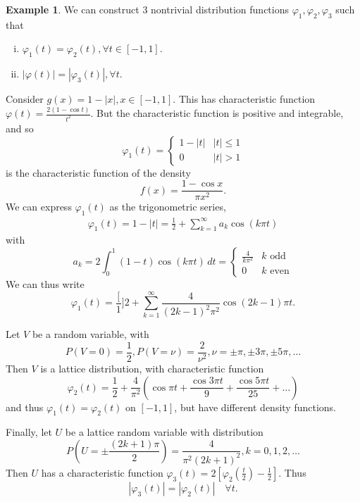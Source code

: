 \documentclass[10pt, oneside, reqno]{amsart}
\theoremstyle{plain}%
\theoremstyle{definition}
\newtheorem{exmp}[thm]{Example}
\theoremstyle{remark}
\renewcommand{\phi}{\varphi}
\begin{document}
\begin{exmp}
    We can construct 3 nontrivial distribution functions $\phi_1, \phi_2, \phi_3$ such that 
\begin{enumerate}[(i)]
    \item $\phi_1(t) = \phi_2(t), \forall t \in [-1,1]$.  
    \item $|\phi(t)| = | \phi_3(t) |, \forall t$.  
\end{enumerate}

Consider $g(x) = 1 - | x |, x \in [ -1, 1]$.  This has characteristic function $\phi(t) = \frac{2(1 - \cos t)}{t^2}$.  But the characteristic function is positive and integrable, and so\[
    \phi_1(t) = \begin{cases}
        1 - |t| & |t| \leq 1 \\
        0       & |t| > 1
    \end{cases}
\] is the characteristic function of the density \[
    f(x) = \frac{1 - \cos x}{\pi x^2}.
\]  We can express $\phi_1(t)$ as the trigonometric series, \begin{align*}
    \phi_1(t) = 1 - |t| = \frac{1}{2} + \sum_{k=1}^\infty a_k \cos( k \pi t) 
\end{align*} with \[
    a_k = 2 \int_0^1 ( 1 - t) \cos(k \pi t) \, dt = \begin{cases} 
        \frac{4}{k \pi^2}   &\text{$k$ odd} \\
        0                   &\text{$k$ even}
    \end{cases}
\]
We can thus write \[
    \phi_1(t) = \frac[1]{2} + \sum_{k=1}^\infty \frac{4}{(2k-1)^2 \pi^2} \cos(2k-1) \pi t.
\]

Let $V$ be a random variable, with \[
    P(V = 0) = \frac{1}{2}, P(V = \nu) = \frac{2}{\nu^2}, \nu = \pm \pi, \pm 3 \pi, \pm 5 \pi, \dots
\]    Then $V$ is a lattice distribution, with characteristic function \[
    \phi_2(t) = \frac{1}{2} + \frac{4}{\pi^2} \left( \cos \pi t + \frac{ \cos 3 \pi t}{9} + \frac{\cos 5 \pi t}{25} + \dots \right) 
\] and thus $\phi_1(t) = \phi_2(t)$ on $[-1,1]$, but have different density functions.

Finally, let $U$ be a lattice random variable with distribution \[
    P(U = \pm \frac{(2k+1) \pi}{2}) = \frac{4}{\pi^2(2k+1)^2}, k = 0,1, 2, \dots
\]  Then $U$ has a characteristic function $\phi_3(t) = 2 \left[ \phi_2(\frac{t}{2}) - \frac{1}{2} \right]$.  Thus \[
    | \phi_3(t) | = | \phi_2(t) | \quad \forall t.
    \]
\end{exmp}
\end{document}
